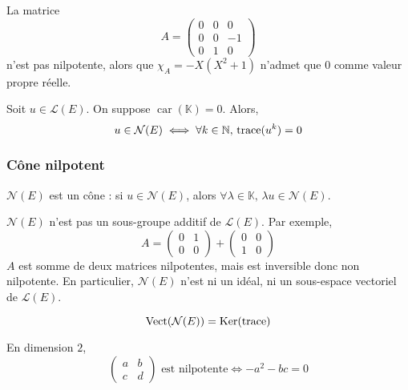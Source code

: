 	\begin{cexample}
		La matrice
		\[
			A = \begin{pmatrix}
				0 & 0 & 0 \\
				0 & 0 & -1 \\
				0 & 1 & 0
			\end{pmatrix}
		\]
		n'est pas nilpotente, alors que $\chi_A = -X(X^2 + 1)$ n'admet que $0$ comme valeur propre réelle.
	\end{cexample}
	
	\begin{proposition}
		Soit $u \in \mathcal{L}(E)$. On suppose $\operatorname{car}(\mathbb{K}) = 0$. Alors,
		\[ u \in \mathcal{N}(E) \iff \forall k \in \mathbb{N}, \, \operatorname{trace}(u^k) = 0 \]
	\end{proposition}
	
	\subsubsection{Cône nilpotent}
	
	\begin{proposition}
		$\mathcal{N}(E)$ est un cône : si $u \in \mathcal{N}(E)$, alors $\forall \lambda \in \mathbb{K}, \, \lambda u \in \mathcal{N}(E)$.
	\end{proposition}
	
	\begin{remark}
		$\mathcal{N}(E)$ n'est pas un sous-groupe additif de $\mathcal{L}(E)$. Par exemple,
		\[
			A =
			\begin{pmatrix}
				0 & 1 \\
				0 & 0
			\end{pmatrix}
			+
			\begin{pmatrix}
				0 & 0 \\
				1 & 0
			\end{pmatrix}
		\]
		$A$ est somme de deux matrices nilpotentes, mais est inversible donc non nilpotente. En particulier, $\mathcal{N}(E)$ n'est ni un idéal, ni un sous-espace vectoriel de $\mathcal{L}(E)$.
	\end{remark}
	
	\begin{proposition}
		\[ \operatorname{Vect}(\mathcal{N}(E)) = \mathrm{Ker}(\operatorname{trace}) \]
	\end{proposition}
	
	\begin{example}
		En dimension $2$,
		\[
			\begin{pmatrix}
				a & b \\
				c & d
			\end{pmatrix}
			\text{ est nilpotente}
			\iff
			-a^2 -bc = 0
		\]
	\end{example}
	
